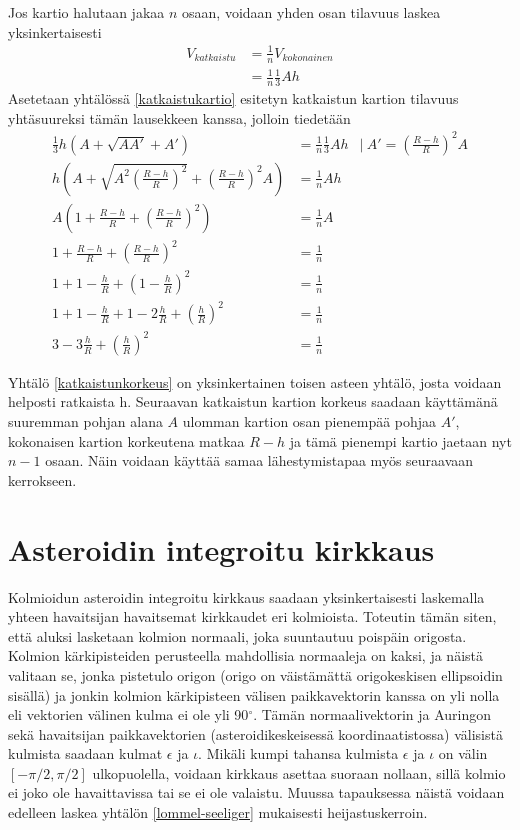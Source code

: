 \documentclass[12pt,a4paper,titlepage]{article}
\begin{document}
Jos kartio halutaan jakaa $n$ osaan, voidaan yhden osan tilavuus laskea yksinkertaisesti
\begin{align}
	V_{katkaistu} &= \frac{1}{n}V_{kokonainen}\nonumber\\
	&= \frac{1}{n}\frac{1}{3}Ah \nonumber
\end{align}
Asetetaan yhtälössä \ref{katkaistukartio} esitetyn katkaistun kartion tilavuus yhtäsuureksi tämän lausekkeen kanssa, jolloin tiedetään
\begin{align}\label{katkaistunkorkeus}
	\frac{1}{3} h (A + \sqrt {AA'} + A') &= \frac{1}{n}\frac{1}{3}Ah &\bigg\vert~ A'=\left(\frac{R-h}{R}\right)^2A \nonumber\\
	h \left(A + \sqrt {A^2\left(\frac{R-h}{R}\right)^2} + \left(\frac{R-h}{R}\right)^2A\right) &= \frac{1}{n}Ah & \nonumber\\
	A\left(1 + \frac{R-h}{R} + \left(\frac{R-h}{R}\right)^2\right) &= \frac{1}{n}A &\nonumber\\
	1 + \frac{R-h}{R} + \left(\frac{R-h}{R}\right)^2 &= \frac{1}{n} &\nonumber\\
	1 + 1-\frac{h}{R} + \left(1-\frac{h}{R}\right)^2 &= \frac{1}{n} &\nonumber\\
	1 + 1-\frac{h}{R} + 1-2\frac{h}{R}+\left(\frac{h}{R}\right)^2 &= \frac{1}{n} &\nonumber\\
	3 - 3\frac{h}{R} +\left(\frac{h}{R}\right)^2 &= \frac{1}{n} &
\end{align}

Yhtälö \ref{katkaistunkorkeus} on yksinkertainen toisen asteen yhtälö, josta voidaan helposti ratkaista h. Seuraavan katkaistun kartion korkeus saadaan käyttämänä suuremman pohjan alana $A$ ulomman kartion osan pienempää pohjaa $A'$, kokonaisen kartion korkeutena matkaa $R-h$ ja tämä pienempi kartio jaetaan nyt $n-1$ osaan. Näin voidaan käyttää samaa lähestymistapaa myös seuraavaan kerrokseen.
	
\section{Asteroidin integroitu kirkkaus}
Kolmioidun asteroidin integroitu kirkkaus saadaan yksinkertaisesti laskemalla yhteen havaitsijan havaitsemat kirkkaudet eri kolmioista. Toteutin tämän siten, että aluksi lasketaan kolmion normaali, joka suuntautuu poispäin origosta. Kolmion kärkipisteiden perusteella mahdollisia normaaleja on kaksi, ja näistä valitaan se, jonka pistetulo origon (origo on väistämättä origokeskisen ellipsoidin sisällä) ja jonkin kolmion kärkipisteen välisen paikkavektorin kanssa on yli nolla eli vektorien välinen kulma ei ole yli 90$^\circ$. Tämän normaalivektorin ja Auringon sekä havaitsijan paikkavektorien (asteroidikeskeisessä koordinaatistossa) välisistä kulmista saadaan kulmat $\epsilon$ ja $\iota$. Mikäli kumpi tahansa kulmista $\epsilon$ ja $\iota$ on välin $[-\pi/2, \pi/2]$ ulkopuolella, voidaan kirkkaus asettaa suoraan nollaan, sillä kolmio ei joko ole havaittavissa tai se ei ole valaistu. Muussa tapauksessa näistä voidaan edelleen laskea yhtälön \ref{lommel-seeliger} mukaisesti heijastuskerroin.
\end{document}

